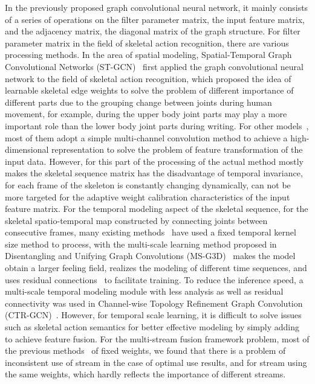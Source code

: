 \documentclass[letterpaper]{article} \usepackage[submission]{aaai23}  \usepackage{times}  \usepackage{helvet}  \usepackage{courier}  \usepackage[hyphens]{url}  \usepackage{graphicx} \urlstyle{rm} \def\UrlFont{\rm}  \usepackage{natbib}  \usepackage{caption} \frenchspacing  \setlength{\pdfpagewidth}{8.5in} \setlength{\pdfpageheight}{11in} \usepackage{algorithm}
\begin{document}
 In the previously proposed graph convolutional neural network, it mainly consists of a series of operations on the filter parameter matrix, the input feature matrix, and the adjacency matrix, the diagonal matrix of the graph structure. For filter parameter matrix in the field of skeletal action recognition, there are various processing methods. In the area of spatial modeling, Spatial-Temporal Graph Convolutional Networks (ST-GCN)~\cite{2018Spatial} first applied the graph convolutional neural network to the field of skeletal action recognition, which proposed the idea of learnable skeletal edge weights to solve the problem of different importance of different parts due to the grouping change between joints during human movement, for example, during the upper body joint parts may play a more important role than the lower body joint parts during writing. For other models~\cite{2018Two,2019Spatial,2021Channel}, most of them adopt a simple multi-channel convolution method to achieve a high-dimensional representation to solve the problem of feature transformation of the input data. However, for this part of the processing of the actual method mostly makes the skeletal sequence matrix has the disadvantage of temporal invariance, for each frame of the skeleton is constantly changing dynamically, can not be more targeted for the adaptive weight calibration characteristics of the input feature matrix. For the temporal modeling aspect of the skeletal sequence, for the skeletal spatio-temporal map constructed by connecting joints between consecutive frames, many existing methods~\cite{2018Spatial,2019Spatio,2018Two,2020Skeleton,2019Actional} have used a fixed temporal kernel size method to process, with the multi-scale learning method proposed in Disentangling and Unifying Graph Convolutions (MS-G3D)~\cite{2020Disentangling} makes the model obtain a larger feeling field, realizes the modeling of different time sequences, and uses residual connections~\cite{2016Deep} to facilitate training. To reduce the inference speed, a multi-scale temporal modeling module with less analysis as well as residual connectivity was used in Channel-wise Topology Refinement Graph Convolution (CTR-GCN)~\cite{2021Channel}. However, for temporal scale learning, it is difficult to solve issues such as skeletal action semantics for better effective modeling by simply adding to achieve feature fusion. For the multi-stream fusion framework problem, most of the previous methods~\cite{2021Channel,DBLP:conf/cvpr/Cheng0HC0L20,2020Dynamic} of fixed weights, we found that there is a problem of inconsistent use of stream in the case of optimal use results, and for stream using the same weights, which hardly reflects the importance of different streams.
\end{document}
